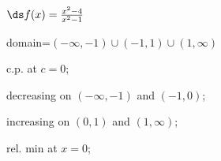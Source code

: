 {$\ds f(x) =\frac{x^2-4}{x^2-1}$
}
{domain=$(-\infty,-1)\cup(-1,1)\cup(1,\infty)$

c.p. at $c=0$; 

decreasing on $(-\infty,-1)$ and $(-1,0)$;

increasing on $(0,1)$ and $(1,\infty)$;

rel. min at $x=0$;
}
